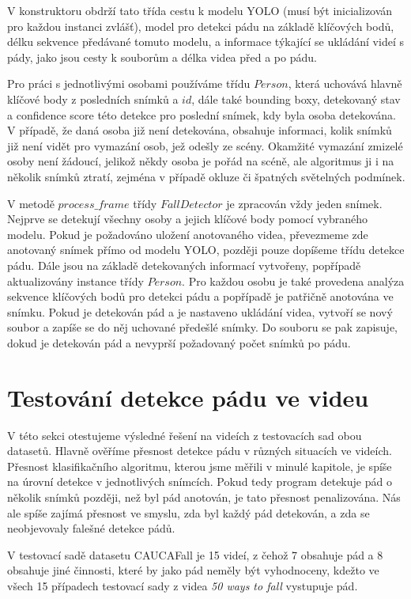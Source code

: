 V konstruktoru obdrží tato třída cestu k modelu YOLO (musí být inicializován
pro každou instanci zvlášť), model pro detekci pádu na základě klíčových bodů,
délku sekvence předávané tomuto modelu, a informace týkající se ukládání videí
s pády, jako jsou cesty k souborům a délka videa před a po pádu.

Pro práci s jednotlivými osobami používáme třídu $Person$, která uchovává
hlavně klíčové body z posledních snímků a $id$, dále také bounding boxy,
detekovaný stav a confidence score této detekce pro poslední snímek, kdy byla
osoba detekována. V případě, že daná osoba již není detekována, obsahuje
informaci, kolik snímků již není vidět pro vymazání osob, jež odešly ze scény.
Okamžité vymazání zmizelé osoby není žádoucí, jelikož někdy osoba je pořád na
scéně, ale algoritmus ji i na několik snímků ztratí, zejména v případě okluze
či špatných světelných podmínek.

V metodě $process\_frame$ třídy $FallDetector$ je zpracován vždy jeden snímek.
Nejprve se detekují všechny osoby a jejich klíčové body pomocí vybraného
modelu. Pokud je požadováno uložení anotovaného videa, převezmeme zde anotovaný
snímek přímo od modelu YOLO, později pouze dopíšeme třídu detekce pádu. Dále
jsou na základě detekovaných informací vytvořeny, popřípadě aktualizovány
instance třídy $Person$. Pro každou osobu je také provedena analýza sekvence
klíčových bodů pro detekci pádu a popřípadě je patřičně anotována ve snímku.
Pokud je detekován pád a je nastaveno ukládání videa, vytvoří se nový soubor a
zapíše se do něj uchované předešlé snímky. Do souboru se pak zapisuje, dokud je
detekován pád a nevyprší požadovaný počet snímků po pádu.

\section{Testování detekce pádu ve videu}
\label{sec:FallDetectionTest}

V této sekci otestujeme výsledné řešení na videích z testovacích sad obou
datasetů. Hlavně ověříme přesnost detekce pádu v různých situacích ve videích.
Přesnost klasifikačního algoritmu, kterou jsme měřili v minulé kapitole, je
spíše na úrovní detekce v jednotlivých snímcích. Pokud tedy program detekuje
pád o několik snímků později, než byl pád anotován, je tato přesnost
penalizována. Nás ale spíše zajímá přesnost ve smyslu, zda byl každý pád
detekován, a zda se neobjevovaly falešné detekce pádů.

V testovací sadě datasetu CAUCAFall je 15 videí, z čehož 7 obsahuje pád a 8
obsahuje jiné činnosti, které by jako pád neměly být vyhodnoceny, kdežto ve
všech 15 případech testovací sady z videa \textit{50 ways to fall} vystupuje
pád.

